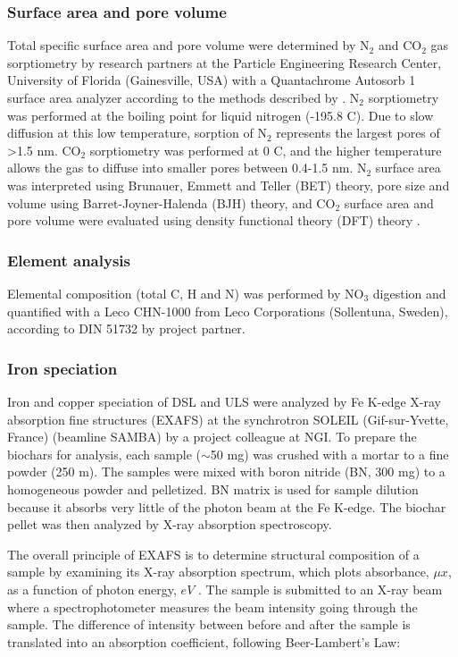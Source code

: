 \subsubsection{Surface area and pore volume}
Total specific surface area and pore volume were determined by $\mathrm{N_2}$ and $\mathrm{CO_2}$ gas sorptiometry by research partners at the Particle Engineering Research Center, University of Florida (Gainesville, USA) with a Quantachrome Autosorb 1 surface area analyzer according to the methods described by \cite{kwon2005}.  $\mathrm{N_2}$ sorptiometry was performed at the boiling point for liquid nitrogen (-195.8 \textdegree C). Due to slow diffusion at this low temperature, sorption of  $\mathrm{N_2}$ represents the largest pores of \textgreater 1.5 nm. $\mathrm{CO_2}$ sorptiometry was performed at 0 \textdegree C, and the higher temperature allows the gas to diffuse into smaller pores between 0.4-1.5 nm. $\mathrm{N_2}$ surface area was interpreted using Brunauer, Emmett and Teller (BET) theory, pore size and volume using Barret-Joyner-Halenda (BJH) theory, and $\mathrm{CO_2}$ surface area and pore volume were evaluated using density functional theory (DFT) theory . 

\subsubsection{Element analysis}
Elemental composition (total C, H and N) was performed by $\mathrm{NO_3}$ digestion and quantified with a Leco CHN-1000 from Leco Corporations (Sollentuna, Sweden), according to DIN 51732 by project partner.  

\subsubsection{Iron speciation}
Iron and copper speciation of DSL and ULS were analyzed by Fe K-edge X-ray absorption fine structures (EXAFS) at the synchrotron SOLEIL (Gif-sur-Yvette, France) (beamline SAMBA) by a project colleague at NGI. To prepare the biochars for analysis, each sample ($\sim$50 mg) was crushed with a mortar to a fine powder (250 \textmu m). The samples were mixed with boron nitride (BN, 300 mg) to a homogeneous powder and pelletized. BN matrix is used for sample dilution because it absorbs very little of the photon beam at the Fe K-edge. The biochar pellet was then analyzed by X-ray absorption spectroscopy.  

The overall principle of EXAFS is to determine structural composition of a sample by examining its X-ray absorption spectrum, which plots absorbance, $\mu x$, as a function of photon energy, $eV$ \citep{vlaica2004exafs}. The sample is submitted to an X-ray beam where a spectrophotometer measures the beam intensity going through the sample. The difference of intensity between before and after the sample is translated into an absorption coefficient, following Beer-Lambert's Law: 

